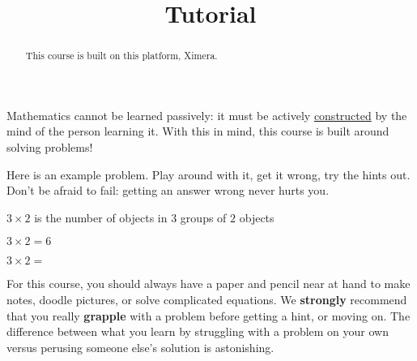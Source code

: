 \documentclass{ximera}
\title{Tutorial}
\begin{document}
\begin{abstract}
  This course is built on this platform, Ximera.
\end{abstract}

Mathematics cannot be learned passively: it must be actively
\href{http://en.wikipedia.org/wiki/Constructivism_(philosophy_of_education)}{constructed}
by the mind of the person learning it.  With this in mind, this course
is built around solving problems!

Here is an example problem.  Play around with it, get it wrong, try
the hints out.  Don't be afraid to fail: getting an answer wrong never
hurts you.

\begin{question}
  \begin{solution}
    \begin{hint}
      $3 \times 2$ is the number of objects in $3$ groups of $2$ objects
    \end{hint}
    \begin{hint}
    \end{hint}
    \begin{hint}
      $3\times 2=6$
    \end{hint}
    $3\times 2 = $ 
  \end{solution}
\end{question}

For this course, you should always have a paper and pencil near at hand to make notes, doodle pictures, or solve complicated equations.
We \textbf{strongly} recommend that you really \textbf{grapple} with a problem before getting a hint, or moving on.  
The difference between what you learn by struggling with a problem on your own versus perusing someone else's solution is astonishing.
\end{document}
